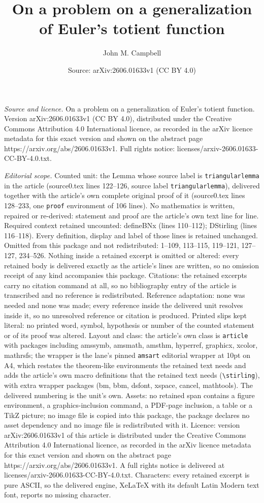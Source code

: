 \documentclass[10pt,a4paper]{amsart}
\title[On a problem on a generalization of Euler's totient function]{On a problem on a generalization of Euler's totient function}
\author{John M. Campbell}
\date{Source: arXiv:2606.01633v1 (CC BY 4.0)}
\begin{document}
\maketitle

\noindent\emph{Source and licence.} On a problem on a generalization of Euler's totient function. Version arXiv:2606.01633v1 (CC BY 4.0), distributed under the Creative Commons Attribution 4.0 International licence, as recorded in the arXiv licence metadata for this exact version and shown on the abstract page https://arxiv.org/abs/2606.01633v1. Full rights notice: licenses/arxiv-2606.01633-CC-BY-4.0.txt.\par\smallskip

\noindent\textit{Editorial scope.} Counted unit: the Lemma whose source label is \texttt{triangularlemma} in the article (source0.tex lines 122--126, source label \texttt{triangularlemma}), delivered together with the article's own complete original proof of it (source0.tex lines 128--233, one \texttt{proof} environment of 106 lines). No mathematics is written, repaired or re-derived: statement and proof are the article's own text line for line. Required context retained uncounted: defineBNx (lines 110--112); DStirling (lines 116--118). Every definition, display and label of those lines is retained unchanged. Omitted from this package and not redistributed: 1--109, 113--115, 119--121, 127--127, 234--526. Nothing inside a retained excerpt is omitted or altered: every retained body is delivered exactly as the article's lines are written, so no omission receipt of any kind accompanies this package. Citations: the retained excerpts carry no citation command at all, so no bibliography entry of the article is transcribed and no reference is redistributed. Reference adaptation: none was needed and none was made; every reference inside the delivered unit resolves inside it, so no unresolved reference or citation is produced. Printed slips kept literal: no printed word, symbol, hypothesis or number of the counted statement or of its proof was altered. Layout and class: the article's own class is \texttt{article} with packages including amssymb, amsmath, amsthm, hyperref, graphicx, xcolor, mathrsfs; the wrapper is the lane's pinned \texttt{amsart} editorial wrapper at 10pt on A4, which restates the theorem-like environments the retained text needs and adds the article's own macro definitions that the retained text needs (\texttt{\textbackslash stirling}), with extra wrapper packages (bm, bbm, dsfont, xspace, cancel, mathtools). The delivered numbering is the unit's own. Assets: no retained span contains a figure environment, a graphics-inclusion command, a PDF-page inclusion, a table or a TikZ picture; no image file is copied into this package, the package declares no asset dependency and no image file is redistributed with it. Licence: version arXiv:2606.01633v1 of this article is distributed under the Creative Commons Attribution 4.0 International licence, as recorded in the arXiv licence metadata for this exact version and shown on the abstract page https://arxiv.org/abs/2606.01633v1. A full rights notice is delivered at licenses/arxiv-2606.01633-CC-BY-4.0.txt. Characters: every retained excerpt is pure ASCII, so the delivered engine, XeLaTeX with its default Latin Modern text font, reports no missing character.
\end{document}
